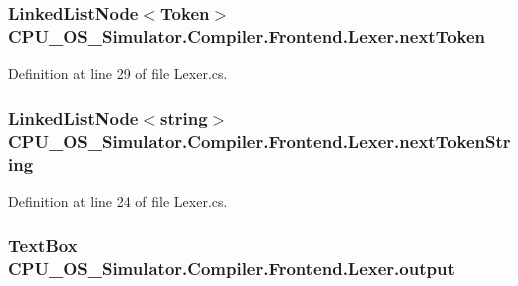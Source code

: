\subsubsection[{next\+Token}]{\setlength{\rightskip}{0pt plus 5cm}Linked\+List\+Node$<${\bf Token}$>$ C\+P\+U\+\_\+\+O\+S\+\_\+\+Simulator.\+Compiler.\+Frontend.\+Lexer.\+next\+Token\hspace{0.3cm}{\ttfamily [private]}}\label{class_c_p_u___o_s___simulator_1_1_compiler_1_1_frontend_1_1_lexer_a9bdd0bc4e775f8708a1efebd0e84bc7c}


Definition at line 29 of file Lexer.\+cs.

\hypertarget{class_c_p_u___o_s___simulator_1_1_compiler_1_1_frontend_1_1_lexer_a6795b61d4a157858e6471adb636a16f0}{}
\subsubsection[{next\+Token\+String}]{\setlength{\rightskip}{0pt plus 5cm}Linked\+List\+Node$<$string$>$ C\+P\+U\+\_\+\+O\+S\+\_\+\+Simulator.\+Compiler.\+Frontend.\+Lexer.\+next\+Token\+String\hspace{0.3cm}{\ttfamily [private]}}\label{class_c_p_u___o_s___simulator_1_1_compiler_1_1_frontend_1_1_lexer_a6795b61d4a157858e6471adb636a16f0}


Definition at line 24 of file Lexer.\+cs.

\hypertarget{class_c_p_u___o_s___simulator_1_1_compiler_1_1_frontend_1_1_lexer_ab2c4e18875ad66f9f4b1debf32e21d97}{}
\subsubsection[{output}]{\setlength{\rightskip}{0pt plus 5cm}Text\+Box C\+P\+U\+\_\+\+O\+S\+\_\+\+Simulator.\+Compiler.\+Frontend.\+Lexer.\+output\hspace{0.3cm}{\ttfamily [private]}}\label{class_c_p_u___o_s___simulator_1_1_compiler_1_1_frontend_1_1_lexer_ab2c4e18875ad66f9f4b1debf32e21d97}


